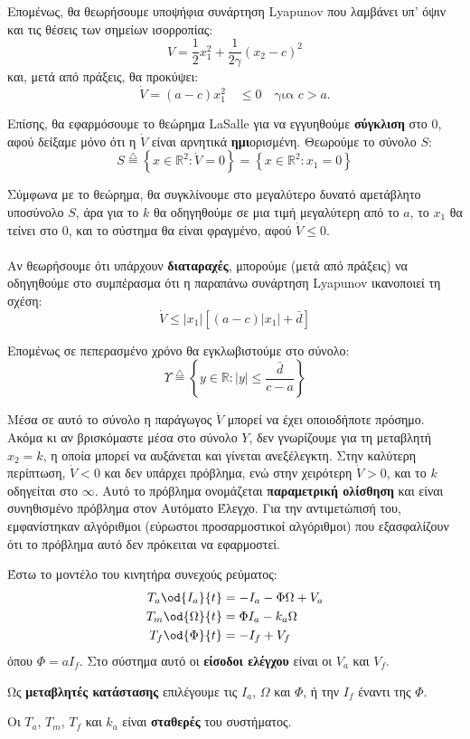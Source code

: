 \documentclass[11pt,a4paper,notitlepage,fleqn]{article}
\begin{document}
Επομένως, θα θεωρήσουμε υποψήφια συνάρτηση Lyapunov που λαμβάνει υπ' όψιν
και τις θέσεις των σημείων ισορροπίας:
\[
V = \frac{1}{2} x_1^2 +\frac{1}{2γ}(x_2 - c)^2
\]
και, μετά από πράξεις, θα προκύψει:
\[
\dot V = (a-c) x_1^2 \quad \leq 0 \quad \text{για } c > a.
\]

Επίσης, θα εφαρμόσουμε το θεώρημα LaSalle για να εγγυηθούμε \textbf{σύγκλιση} στο 0, αφού δείξαμε μόνο ότι η \( \dot V \) είναι
αρνητικά \textbf{ημι}ορισμένη. Θεωρούμε το σύνολο \( S \):
\[
S \overset{\triangle}{=} \left\lbrace
x \in \mathbb R^2:
\dot V = 0
 \right\rbrace = \left\lbrace
 x\in\mathbb R^2: x_1 = 0
  \right\rbrace
\]

Σύμφωνα με το θεώρημα, θα συγκλίνουμε στο μεγαλύτερο δυνατό αμετάβλητο υποσύνολο \( S \), άρα για το \( k \) θα οδηγηθούμε σε μια τιμή μεγαλύτερη
από το \( a \), το \( x_1 \) θα τείνει στο \( 0 \), και το σύστημα θα είναι
φραγμένο, αφού \( \dot V \leq 0 \).

\paragraph{}
Αν θεωρήσουμε ότι υπάρχουν \textbf{διαταραχές}, μπορούμε (μετά από πράξεις) να οδηγηθούμε στο συμπέρασμα ότι η παραπάνω συνάρτηση Lyapunov
ικανοποιεί τη σχέση:
\[
\dot V \leq |x_1| \left[
(a-c)|x_1| + \bar d
\right]
\]

Επομένως σε πεπερασμένο χρόνο θα εγκλωβιστούμε στο σύνολο:
\[
Υ \overset{\triangle}{=} \left\lbrace y \in \mathbb R
: |y| \leq \frac{\bar d}{c-a} \right\rbrace
\]

Μέσα σε αυτό το σύνολο η παράγωγος \( \dot V \) μπορεί να έχει οποιοδήποτε
πρόσημο. Ακόμα κι αν βρισκόμαστε μέσα στο σύνολο \( Y \), δεν γνωρίζουμε
για τη μεταβλητή \( x_2 = k \), η οποία μπορεί να αυξάνεται και γίνεται
ανεξέλεγκτη. Στην καλύτερη περίπτωση, \( \dot V < 0 \) και δεν υπάρχει
πρόβλημα, ενώ στην χειρότερη \( \dot V > 0 \), και το \( k \) οδηγείται
στο \( \infty \). Αυτό το πρόβλημα ονομάζεται \textbf{παραμετρική ολίσθηση}
και είναι συνηθισμένο πρόβλημα στον Αυτόματο Έλεγχο. Για την αντιμετώπισή
του, εμφανίστηκαν αλγόριθμοι (εύρωστοι προσαρμοστικοί αλγόριθμοι) που
εξασφαλίζουν ότι το πρόβλημα αυτό δεν πρόκειται να εφαρμοστεί.

\begin{exercise}
	Έστω το μοντέλο του κινητήρα συνεχούς ρεύματος:
	\begin{align*}
		T_a \od{I_a}{t} &= -I_a - \Phi \Omega + V_a \\
		T_m \od{\Omega}{t} &= \Phi I_a - k_a\Omega \\
		T_f \od{\Phi}{t} &= -I_f + V_f
	\end{align*}
	όπου \( \Phi = a I_f \).
	\tcblower
	Στο σύστημα αυτό οι \textbf{είσοδοι ελέγχου} είναι οι \( V_a \) και
	\( V_f \).

	Ως \textbf{μεταβλητές κατάστασης} επιλέγουμε τις
	\( I_a \), \( \Omega \) και \( \Phi \), ή την \( I_f \) έναντι
	της \( \Phi \).

	Οι \( T_a \), \( T_m \), \( T_f \) και \( k_a \) είναι
	\textbf{σταθερές} του συστήματος.
\end{exercise}
\end{document}
